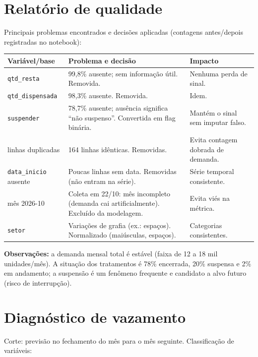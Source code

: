 \documentclass[11pt,a4paper]{article}
\begin{document}
\section{Relatório de qualidade}
Principais problemas encontrados e decisões aplicadas (contagens antes/depois registradas no notebook):

\begin{tabularx}{\textwidth}{@{}p{3.3cm} X p{3.4cm}@{}}
\toprule
\textbf{Variável/base} & \textbf{Problema e decisão} & \textbf{Impacto} \\
\midrule
\texttt{qtd\_resta} & 99,8\% ausente; sem informação útil. Removida. & Nenhuma perda de sinal. \\
\texttt{qtd\_dispensada} & 98,3\% ausente. Removida. & Idem. \\
\texttt{suspender} & 78,7\% ausente; ausência significa ``não suspenso''. Convertida em flag binária. & Mantém o sinal sem imputar falso. \\
linhas duplicadas & 164 linhas idênticas. Removidas. & Evita contagem dobrada de demanda. \\
\texttt{data\_inicio} ausente & Poucas linhas sem data. Removidas (não entram na série). & Série temporal consistente. \\
mês 2026-10 & Coleta em 22/10: mês incompleto (demanda cai artificialmente). Excluído da modelagem. & Evita viés na métrica. \\
\texttt{setor} & Variações de grafia (ex.: espaços). Normalizado (maiúsculas, espaços). & Categorias consistentes. \\
\bottomrule
\end{tabularx}

\textbf{Observações:} a demanda mensal total é estável (faixa de 12 a 18 mil unidades/mês). A situação dos tratamentos é 78\% encerrada, 20\% suspensa e 2\% em andamento; a suspensão é um fenômeno frequente e candidato a alvo futuro (risco de interrupção).

\section{Diagnóstico de vazamento}
Corte: previsão no fechamento do mês para o mês seguinte. Classificação de variáveis:
\end{document}
